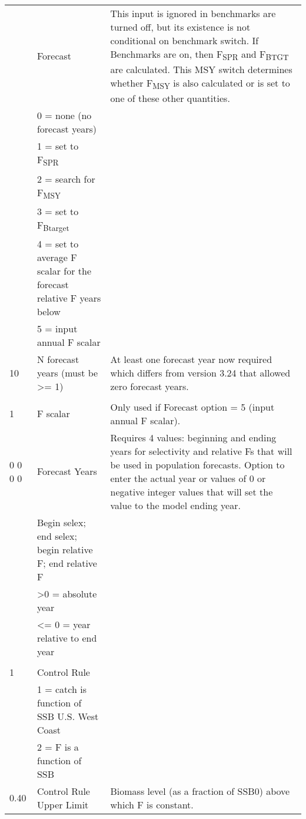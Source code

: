\begin{landscape}
\begin{longtable}{p{3cm} p{7cm} p{11cm}}
  \pagebreak
  2 & Forecast & \multirow{1}{1cm}[-0.1cm]{\parbox{11cm }{ This input is ignored in benchmarks are turned off, but its existence is not conditional on benchmark switch.  If Benchmarks are on, then F\textsubscript{SPR} and F\textsubscript{BTGT} are calculated.  This MSY switch determines whether F\textsubscript{MSY} is also calculated or is set to one of these other quantities.}} \\
    & 0 = none (no forecast years) & \\
    & 1 = set to F\textsubscript{SPR} & \\
    & 2 = search for F\textsubscript{MSY} & \\
    & 3 = set to F\textsubscript{Btarget} & \\
    & 4 = set to average F scalar for the forecast relative F years below & \\
    & 5 = input annual F scalar & \\
    
  \hline
  10 & N forecast years (must be >= 1) &  \multirow{1}{1cm}[-0.1cm]{\parbox{11cm }{ At least one forecast year now required which differs from version 3.24 that allowed zero forecast years.}} \\
     & & \\
     
  \hline
  1 & F scalar & \multirow{1}{1cm}[-0.1cm]{\parbox{11cm}{Only used if Forecast option = 5 (input annual F scalar).}}\\
  
  \hline
  0 0 0 0 & Forecast Years &  \multirow{1}{1cm}[-0.1cm]{\parbox{11cm}{Requires 4 values:  beginning and ending years for selectivity and relative Fs that will be used in population forecasts.  Option to enter the actual year or values of 0 or negative integer values that will set the value to the model ending year.}}\\
    & Begin selex; end selex; begin relative F; end relative F & \\
    & >0 = absolute year & \\
    & <= 0 = year relative to end year & \\
    & & \\
  
 \hline   
 1 & Control Rule & \\
   & 1 = catch is function of SSB U.S. West Coast & \\
   & 2 = F is a function of SSB & \\
   
 \hline
 0.40 & Control Rule Upper Limit & \multirow{1}{1cm}[-0.1cm]{\parbox{11cm}{Biomass level (as a fraction of SSB0) above which F is constant.}} \\
 

\end{longtable}
\end{landscape}
